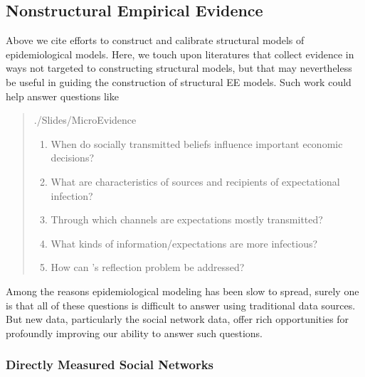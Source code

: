 \subsection{Nonstructural Empirical Evidence}\label{subsec:microEvidence}



Above we cite efforts to construct and calibrate structural models of epidemiological models.  %
Here, we touch upon literatures that collect evidence in ways not targeted to constructing structural models, but that may nevertheless be useful in guiding the construction of structural EE models.  Such work could help answer questions like
\begin{quote}
    \normalfont
    \begin{verbatimwrite}{./Slides/MicroEvidence}
\begin{enumerate}
	\item When do socially transmitted beliefs influence important economic decisions?
    \item What are characteristics of sources and recipients of expectational infection?
    \item Through which channels are expectations mostly transmitted?
    \item What kinds of information/expectations are more infectious?
    \item How can \cite{manski1993identification}'s reflection problem be addressed?
    \end{enumerate}
\end{verbatimwrite}

\end{quote}

Among the reasons epidemiological modeling has been slow to spread,  surely one is that all of these questions is difficult to answer using traditional data sources.  But new data, particularly the social network data, offer rich opportunities for profoundly improving our ability to answer such questions.

\subsubsection{Directly Measured Social Networks}\label{subsubsec:socialnetworks}

